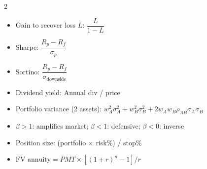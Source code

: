 \documentclass[11pt, letterpaper]{article}
\begin{document}
\begin{tcolorbox}[colback=part4bg, colframe=sectionorange,
  title={\bfseries Key Formulas at a Glance}, arc=3pt, boxrule=1pt]
\footnotesize
\begin{multicols}{2}
\begin{itemize}[noitemsep, leftmargin=*]
  \item Gain to recover loss $L$: $\dfrac{L}{1-L}$
  \item Sharpe: $\dfrac{R_p - R_f}{\sigma_p}$
  \item Sortino: $\dfrac{R_p - R_f}{\sigma_{\text{downside}}}$
  \item Dividend yield: Annual div / price
\end{itemize}
\columnbreak
\begin{itemize}[noitemsep, leftmargin=*]
  \item Portfolio variance (2 assets): $w_A^2\sigma_A^2 + w_B^2\sigma_B^2 + 2w_Aw_B\rho_{AB}\sigma_A\sigma_B$
  \item $\beta > 1$: amplifies market; $\beta < 1$: defensive; $\beta < 0$: inverse
  \item Position size: (portfolio $\times$ risk\%) / stop\%
  \item $\text{FV annuity} = PMT \times [(1+r)^n-1]/r$
\end{itemize}
\end{multicols}
\end{tcolorbox}
\end{document}

